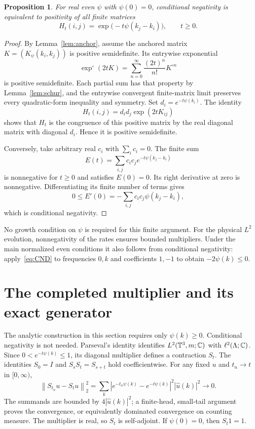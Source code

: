 \documentclass[11pt]{article}
\newtheorem{proposition}[theorem]{Proposition}
\theoremstyle{remark}\newtheorem{remark}[theorem]{Remark}
\newcommand{\norm}[1]{\left\lVert#1\right\rVert}
\begin{document}
\begin{proposition}\label{prop:schoenberg}
For real even $\psi$ with $\psi(0)=0$, conditional negativity
is equivalent to positivity of all finite matrices
\begin{equation}\label{eq:heatmatrix}
 H_t(i,j)=\exp\bigl(-t\psi(k_j-k_i)\bigr),\qquad t\geq0.
\end{equation}
\end{proposition}
\begin{proof}
By Lemma~\ref{lem:anchor}, assume the anchored matrix
$K=(K_\psi(k_i,k_j))$ is positive semidefinite. Its entrywise
exponential
\[
 \exp^{\circ}(2tK)=\sum_{n=0}^\infty
                         \frac{(2t)^n}{n!}K^{\circ n}
\]
is positive semidefinite. Each partial sum has that property by
Lemma~\ref{lem:schur}, and the entrywise convergent finite-matrix
limit preserves every quadratic-form inequality and symmetry.
Set $d_i=e^{-t\psi(k_i)}$. The identity
\[
 H_t(i,j)=d_i d_j\exp(2tK_{ij})
\]
shows that $H_t$ is the congruence of this positive matrix by the
real diagonal matrix with diagonal $d_i$. Hence it is positive
semidefinite.

Conversely, take arbitrary real $c_i$ with $\sum_i c_i=0$.
The finite sum
\[
 E(t)=\sum_{i,j}c_i c_j e^{-t\psi(k_j-k_i)}
\]
is nonnegative for $t\geq0$ and satisfies $E(0)=0$. Its right
derivative at zero is nonnegative. Differentiating its finite
number of terms gives
\[
 0\leq E'(0)=-\sum_{i,j}c_i c_j\psi(k_j-k_i),
\]
which is conditional negativity.
\end{proof}

No growth condition on $\psi$ is required for this finite
argument. For the physical $L^2$ evolution, nonnegativity of the
rates ensures bounded multipliers. Under the main normalized
even conditions it also follows from conditional negativity:
apply~\eqref{eq:CND} to frequencies $0,k$ and coefficients
$1,-1$ to obtain $-2\psi(k)\leq0$.

\section{The completed multiplier and its exact generator}
The analytic construction in this section requires only
$\psi(k)\geq0$. Conditional negativity is not needed.
Parseval's identity identifies $L^2(\mathbb T^3,m;\mathbb C)$ with
$\ell^2(\Lambda;\mathbb C)$. Since $0<e^{-t\psi(k)}\leq1$, its
diagonal multiplier defines a contraction $S_t$.
The identities $S_0=I$ and $S_sS_t=S_{s+t}$ hold coefficientwise.
For any fixed $u$ and $t_n\to t$ in $[0,\infty)$,
\[
 \norm{S_{t_n}u-S_tu}_2^2
 =\sum_k |e^{-t_n\psi(k)}-e^{-t\psi(k)}|^2|\widehat u(k)|^2
 \longrightarrow0.
\]
The summands are bounded by $4|\widehat u(k)|^2$; a finite-head,
small-tail argument proves the convergence, or equivalently
dominated convergence on counting measure. The multiplier is real,
so $S_t$ is self-adjoint. If $\psi(0)=0$, then $S_t1=1$.
\end{document}
